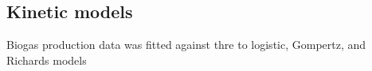 \subsection{Kinetic models}
Biogas production data was fitted against thre to logistic, Gompertz, and
Richards models